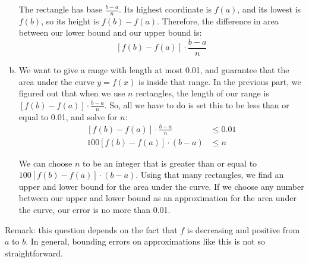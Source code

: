 \begin{solution}
\begin{enumerate}[(a)]
\begin{center}
\end{center}

The rectangle has base $\frac{b-a}{n}$. Its highest coordinate is $f(a)$, and its lowest is $f(b)$, so its height is $f(b)-f(a)$. Therefore, the difference in area between our lower bound and our upper bound is:
\[\left[f(b)-f(a)\right]\cdot\frac{b-a}{n}\]
\item We want to give a range with length at most 0.01, and guarantee that the area under the curve $y=f(x)$ is inside that range. In the previous part, we figured out that when we use $n$ rectangles, the length of our range is $\left[f(b)-f(a)\right]\cdot\frac{b-a}{n}$. So, all we have to do is set this to be less than or equal to 0.01, and solve for $n$:
\begin{align*}
\left[f(b)-f(a)\right]\cdot\frac{b-a}{n}&\leq 0.01 \\
100\left[f(b)-f(a)\right]\cdot(b-a)&\leq n
\end{align*}

We can choose $n$ to be an integer that is greater than or equal to $100\left[f(b)-f(a)\right]\cdot(b-a)$. Using that many rectangles, we find an upper and lower bound for the area under the curve. If we choose any number between our upper and lower bound as an approximation for the area under the curve, our error is no more than 0.01.
\end{enumerate}

Remark: this question depends on the fact that $f$ is decreasing and positive from $a$ to $b$. In general, bounding errors on approximations like this is not so straightforward.
\end{solution}


